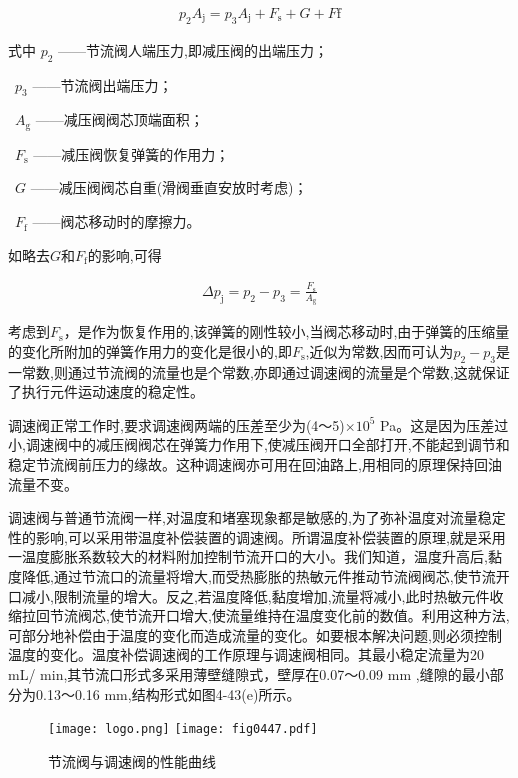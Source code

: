 \begin{equation}
\begin{split}
p_2 A_\text{j} = p_3 A_\text{j} + F_\text{s} + G + F\text{f}
\end{split}
\end{equation}

\noindent
式中 $p_2$ ——节流阀人端压力,即减压阀的出端压力；

\ $p_3$ ——节流阀出端压力；

\ $A_\text{g}$ ——减压阀阀芯顶端面积；

\ $F_\text{s}$ ——减压阀恢复弹簧的作用力；

\ $G$ ——减压阀阀芯自重(滑阀垂直安放时考虑)；

\ $F_\text{f}$ ——阀芯移动时的摩擦力。

如略去$G$和$F_\text{f}$的影响,可得

\begin{equation}
\begin{split}
\Delta p_\text{j} = p_2 - p_3 = \frac{F_\text{s}}{A_\text{g}}
\end{split}
\end{equation}

考虑到$F_\text{s}$，是作为恢复作用的,该弹簧的刚性较小,当阀芯移动时,由于弹簧的压缩量的变化所附加的弹簧作用力的变化是很小的,即$F_\text{s}$,近似为常数,因而可认为$p_2-p_3$是一常数,则通过节流阀的流量也是个常数,亦即通过调速阀的流量是个常数,这就保证了执行元件运动速度的稳定性。

调速阀正常工作时,要求调速阀两端的压差至少为(4～5)$\times 10^5$ Pa。这是因为压差过小,调速阀中的减压阀阀芯在弹簧力作用下,使减压阀开口全部打开,不能起到调节和稳定节流阀前压力的缘故。这种调速阀亦可用在回油路上,用相同的原理保持回油流量不变。

调速阀与普通节流阀一样,对温度和堵塞现象都是敏感的,为了弥补温度对流量稳定性的影响,可以采用带温度补偿装置的调速阀。所谓温度补偿装置的原理,就是采用一温度膨胀系数较大的材料附加控制节流开口的大小。我们知道，温度升高后,黏度降低,通过节流口的流量将增大,而受热膨胀的热敏元件推动节流阀阀芯,使节流开口减小,限制流量的增大。反之,若温度降低,黏度增加,流量将减小,此时热敏元件收缩拉回节流阀芯,使节流开口增大,使流量维持在温度变化前的数值。利用这种方法,可部分地补偿由于温度的变化而造成流量的变化。如要根本解决问题,则必须控制温度的变化。温度补偿调速阀的工作原理与调速阀相同。其最小稳定流量为20 mL/ min,其节流口形式多采用薄壁缝隙式，壁厚在0.07～0.09 mm ,缝隙的最小部分为0.13～0.16 mm,结构形式如图4-43(e)所示。

\begin{figure}
\centering
\ifOpenSource
\texttt{[image: logo.png]}
\else
\texttt{[image: fig0447.pdf]}
\fi
\caption{节流阀与调速阀的性能曲线}
\label{fig:fig0447}
\end{figure}

